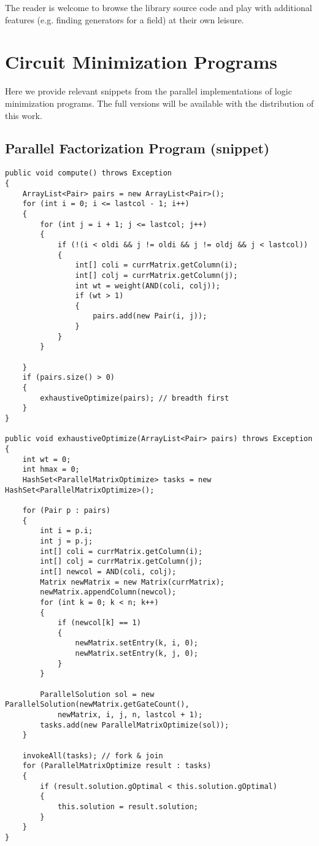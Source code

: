 The reader is welcome to browse the library source code and play with
additional features (e.g. finding generators for a field) at their own leisure.

\section{Circuit Minimization Programs}
Here we provide relevant snippets from the parallel implementations of logic minimization programs. The full versions will be available with the distribution of this work.

\subsection{Parallel Factorization Program (snippet)}
\begin{verbatim}
public void compute() throws Exception
{
    ArrayList<Pair> pairs = new ArrayList<Pair>();
    for (int i = 0; i <= lastcol - 1; i++)
    {
        for (int j = i + 1; j <= lastcol; j++)
        {
            if (!(i < oldi && j != oldi && j != oldj && j < lastcol)) 
            {
                int[] coli = currMatrix.getColumn(i);
                int[] colj = currMatrix.getColumn(j);
                int wt = weight(AND(coli, colj));
                if (wt > 1) 
                {
                    pairs.add(new Pair(i, j));
                }
            }
        } 
        
    }
    if (pairs.size() > 0)
    {
        exhaustiveOptimize(pairs); // breadth first
    }
}

public void exhaustiveOptimize(ArrayList<Pair> pairs) throws Exception
{
    int wt = 0;
    int hmax = 0;
    HashSet<ParallelMatrixOptimize> tasks = new HashSet<ParallelMatrixOptimize>();

    for (Pair p : pairs)
    {
        int i = p.i;
        int j = p.j;
        int[] coli = currMatrix.getColumn(i);
        int[] colj = currMatrix.getColumn(j);
        int[] newcol = AND(coli, colj);
        Matrix newMatrix = new Matrix(currMatrix);
        newMatrix.appendColumn(newcol);
        for (int k = 0; k < n; k++)
        {
            if (newcol[k] == 1)
            {
                newMatrix.setEntry(k, i, 0);
                newMatrix.setEntry(k, j, 0);
            }
        }

        ParallelSolution sol = new ParallelSolution(newMatrix.getGateCount(), 
            newMatrix, i, j, n, lastcol + 1);
        tasks.add(new ParallelMatrixOptimize(sol));
    }

    invokeAll(tasks); // fork & join
    for (ParallelMatrixOptimize result : tasks)
    {
        if (result.solution.gOptimal < this.solution.gOptimal)
        {
            this.solution = result.solution;
        }
    }
}
\end{verbatim}

